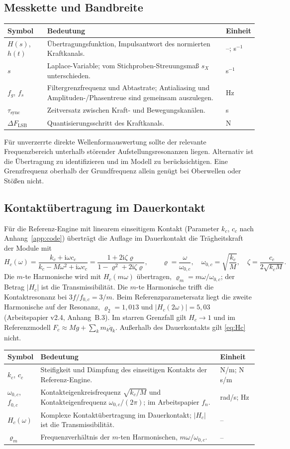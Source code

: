 \documentclass[11pt,a4paper]{article}
\makeatletter
\newenvironment{symtab}{\begin{longtable}{@{}L{.22\textwidth}L{.62\textwidth}L{.12\textwidth}@{}}\toprule\textbf{Symbol}&\textbf{Bedeutung}&\textbf{Einheit}\\\midrule\endhead}{\bottomrule\end{longtable}}
\makeatother
\begin{document}
\subsection{Messkette und Bandbreite}
\begin{symtab}
$H(s)$, $h(t)$&Übertragungsfunktion, Impulsantwort des normierten Kraftkanals.&--; s$^{-1}$\\
$s$&Laplace-Variable; vom Stichproben-Streuungsmaß $s_X$ unterschieden.&s$^{-1}$\\
$f_g$, $f_s$&Filtergrenzfrequenz und Abtastrate; Antialiasing und Amplituden-/Phasentreue sind gemeinsam auszulegen.&Hz\\
$\tau_{\mathrm{sync}}$&Zeitversatz zwischen Kraft- und Bewegungskanälen.&s\\
$\Delta F_{\mathrm{LSB}}$&Quantisierungsschritt des Kraftkanals.&N\\
\end{symtab}
Für unverzerrte direkte Wellenformauswertung sollte der relevante Frequenzbereich unterhalb störender Aufstellungsresonanzen liegen. Alternativ ist die Übertragung zu identifizieren und im Modell zu berücksichtigen. Eine Grenzfrequenz oberhalb der Grundfrequenz allein genügt bei Oberwellen oder Stößen nicht.

\subsection{Kontaktübertragung im Dauerkontakt}\label{sec:kontaktuebertragung}
Für die Referenz-Engine mit linearem einseitigem Kontakt (Parameter $k_c$, $c_c$ nach Anhang~\ref{app:code}) überträgt die Auflage im Dauerkontakt die Trägheitskraft der Module mit
\begin{equation}
H_c(\omega)=\frac{k_c+\mathrm i\omega c_c}{k_c-M\omega^2+\mathrm i\omega c_c}
=\frac{1+2\mathrm i\zeta\varrho}{1-\varrho^2+2\mathrm i\zeta\varrho},\qquad
\varrho=\frac{\omega}{\omega_{0,c}},\quad \omega_{0,c}=\sqrt{\frac{k_c}{M}},\quad \zeta=\frac{c_c}{2\sqrt{k_cM}}.
\label{eq:Hc}
\end{equation}
Die $m$-te Harmonische wird mit $H_c(m\omega)$ übertragen, $\varrho_m=m\omega/\omega_{0,c}$; der Betrag $|H_c|$ ist die Transmissibilität. Die $m$-te Harmonische trifft die Kontaktresonanz bei $3f/f_{0,c}=3/m$. Beim Referenzparametersatz liegt die zweite Harmonische auf der Resonanz, $\varrho_2=1{,}013$ und $|H_c(2\omega)|=5{,}03$ (Arbeitspapier v2.4, Anhang~B.3). Im starren Grenzfall gilt $H_c\to1$ und im Referenzmodell $F_c\approx Mg+\sum_k m_k\ddot q_k$. Außerhalb des Dauerkontakts gilt \eqref{eq:Hc} nicht.
\begin{symtab}
$k_c$, $c_c$&Steifigkeit und Dämpfung des einseitigen Kontakts der Referenz-Engine.&N/m; N s/m\\
$\omega_{0,c}$, $f_{0,c}$&Kontakteigenkreisfrequenz $\sqrt{k_c/M}$ und Kontakteigenfrequenz $\omega_{0,c}/(2\pi)$; im Arbeitspapier $f_n$.&rad/s; Hz\\
$H_c(\omega)$&Komplexe Kontaktübertragung im Dauerkontakt; $|H_c|$ ist die Transmissibilität.&--\\
$\varrho_m$&Frequenzverhältnis der $m$-ten Harmonischen, $m\omega/\omega_{0,c}$.&--\\
\end{symtab}
\end{document}
